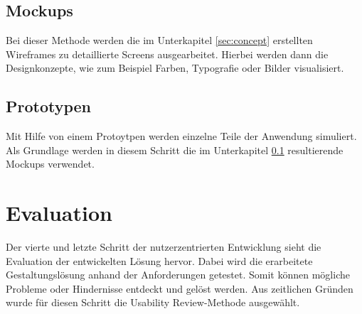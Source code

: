 \subsection{Mockups}\label{sec:mockup}

Bei dieser Methode werden die im Unterkapitel \ref{sec:concept} erstellten Wireframes zu detaillierte Screens ausgearbeitet.
Hierbei werden dann die Designkonzepte, wie zum Beispiel Farben, Typografie oder Bilder visualisiert.

\subsection{Prototypen}

Mit Hilfe von einem Protoytpen werden einzelne Teile der Anwendung simuliert.
Als Grundlage werden in diesem Schritt die im Unterkapitel \ref{sec:mockup} resultierende Mockups verwendet.

\section{Evaluation}

Der vierte und letzte Schritt der nutzerzentrierten Entwicklung sieht die Evaluation der entwickelten Lösung hervor.
Dabei wird die erarbeitete Gestaltungslösung anhand der Anforderungen getestet.
Somit können mögliche Probleme oder Hindernisse entdeckt und gelöst werden.
Aus zeitlichen Gründen wurde für diesen Schritt die Usability Review-Methode ausgewählt.
